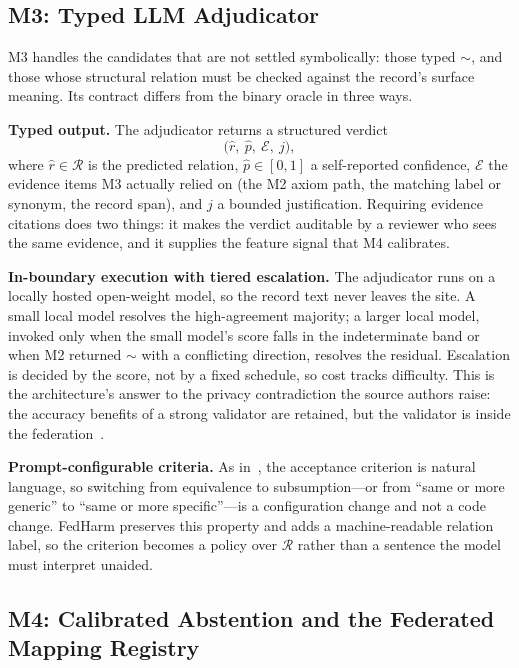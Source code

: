 \documentclass[conference]{IEEEtran}
\begin{document}
\subsection{M3: Typed LLM Adjudicator}

M3 handles the candidates that are not settled symbolically: those typed $\sim$, and those whose structural relation must be checked against the record's surface meaning. Its contract differs from the binary oracle in three ways.

\textbf{Typed output.} The adjudicator returns a structured verdict
\begin{equation}
\big(\hat{r},\ \hat{p},\ \mathcal{E},\ j\big),
\end{equation}
where $\hat{r} \in \mathcal{R}$ is the predicted relation, $\hat{p} \in [0,1]$ a self-reported confidence, $\mathcal{E}$ the evidence items M3 actually relied on (the M2 axiom path, the matching label or synonym, the record span), and $j$ a bounded justification. Requiring evidence citations does two things: it makes the verdict auditable by a reviewer who sees the same evidence, and it supplies the feature signal that M4 calibrates.

\textbf{In-boundary execution with tiered escalation.} The adjudicator runs on a locally hosted open-weight model, so the record text never leaves the site. A small local model resolves the high-agreement majority; a larger local model, invoked only when the small model's score falls in the indeterminate band or when M2 returned $\sim$ with a conflicting direction, resolves the residual. Escalation is decided by the score, not by a fixed schedule, so cost tracks difficulty. This is the architecture's answer to the privacy contradiction the source authors raise: the accuracy benefits of a strong validator are retained, but the validator is inside the federation~\cite{b1,b25}.

\textbf{Prompt-configurable criteria.} As in~\cite{b1}, the acceptance criterion is natural language, so switching from equivalence to subsumption---or from ``same or more generic'' to ``same or more specific''---is a configuration change and not a code change. FedHarm preserves this property and adds a machine-readable relation label, so the criterion becomes a policy over $\mathcal{R}$ rather than a sentence the model must interpret unaided.

\subsection{M4: Calibrated Abstention and the Federated Mapping Registry}
\end{document}

